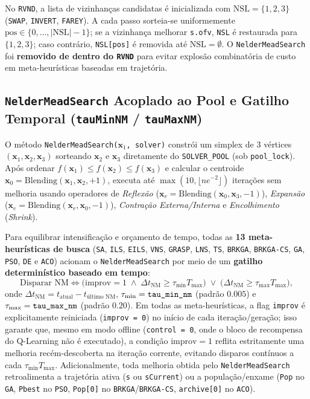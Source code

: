 \documentclass[11pt,a4paper]{article}
\begin{document}
No \texttt{RVND}, a lista de vizinhanças candidatas é inicializada com $\text{NSL} = \{1, 2, 3\}$ (\texttt{SWAP}, \texttt{INVERT}, \texttt{FAREY}). A cada passo sorteia-se uniformemente $\text{pos} \in \{0, \dots, |\text{NSL}|-1\}$; se a vizinhança melhorar \texttt{s.ofv}, \texttt{NSL} é restaurada para $\{1, 2, 3\}$; caso contrário, \texttt{NSL[pos]} é removida até $\text{NSL} = \emptyset$. O \texttt{NelderMeadSearch} foi \textbf{removido de dentro do \texttt{RVND}} para evitar explosão combinatória de custo em meta-heurísticas baseadas em trajetória.

\subsection{\texttt{NelderMeadSearch} Acoplado ao Pool e Gatilho Temporal (\texttt{tauMinNM} / \texttt{tauMaxNM})}

O método \texttt{NelderMeadSearch($\mathbf{x}_1$, solver)} constrói um simplex de 3 vértices $(\mathbf{x}_1, \mathbf{x}_2, \mathbf{x}_3)$ sorteando $\mathbf{x}_2$ e $\mathbf{x}_3$ diretamente do \texttt{SOLVER\_POOL} (sob \texttt{pool\_lock}). Após ordenar $f(\mathbf{x}_1) \le f(\mathbf{x}_2) \le f(\mathbf{x}_3)$ e calcular o centroide $\mathbf{x}_0 = \text{Blending}(\mathbf{x}_1, \mathbf{x}_2, +1)$, executa até $\max(10, \lfloor n e^{-2} \rfloor)$ iterações sem melhoria usando operadores de \emph{Reflexão} ($\mathbf{x}_r = \text{Blending}(\mathbf{x}_0, \mathbf{x}_3, -1)$), \emph{Expansão} ($\mathbf{x}_e = \text{Blending}(\mathbf{x}_r, \mathbf{x}_0, -1)$), \emph{Contração Externa/Interna} e \emph{Encolhimento} (\emph{Shrink}).

Para equilibrar intensificação e orçamento de tempo, todas as \textbf{13 meta-heurísticas de busca} (\texttt{SA}, \texttt{ILS}, \texttt{EILS}, \texttt{VNS}, \texttt{GRASP}, \texttt{LNS}, \texttt{TS}, \texttt{BRKGA}, \texttt{BRKGA-CS}, \texttt{GA}, \texttt{PSO}, \texttt{DE} e \texttt{ACO}) acionam o \texttt{NelderMeadSearch} por meio de um \textbf{gatilho determinístico baseado em tempo}:
\begin{equation}
  \text{Disparar NM} \iff
  \big(\text{improv} = 1 \;\land\; \Delta t_{\text{NM}} \ge \tau_{\min} T_{\max}\big)
  \;\lor\;
  \big(\Delta t_{\text{NM}} \ge \tau_{\max} T_{\max}\big),
  \label{eq:gatilho_nm}
\end{equation}
onde $\Delta t_{\text{NM}} = t_{\text{atual}} - t_{\text{último NM}}$, $\tau_{\min} = \text{\texttt{tau\_min\_nm}}$ (padrão $0.005$) e $\tau_{\max} = \text{\texttt{tau\_max\_nm}}$ (padrão $0.20$). Em todas as meta-heurísticas, a flag \texttt{improv} é explicitamente reiniciada (\texttt{improv = 0}) no início de cada iteração/geração; isso garante que, mesmo em modo offline (\texttt{control = 0}, onde o bloco de recompensa do Q-Learning não é executado), a condição $\text{improv} = 1$ reflita estritamente uma melhoria recém-descoberta na iteração corrente, evitando disparos contínuos a cada $\tau_{\min} T_{\max}$. Adicionalmente, toda melhoria obtida pelo \texttt{NelderMeadSearch} retroalimenta a trajetória ativa (\texttt{s} ou \texttt{sCurrent}) ou a população/enxame (\texttt{Pop} no \texttt{GA}, \texttt{Pbest} no \texttt{PSO}, \texttt{Pop[0]} no \texttt{BRKGA}/\texttt{BRKGA-CS}, \texttt{archive[0]} no \texttt{ACO}).
\end{document}
